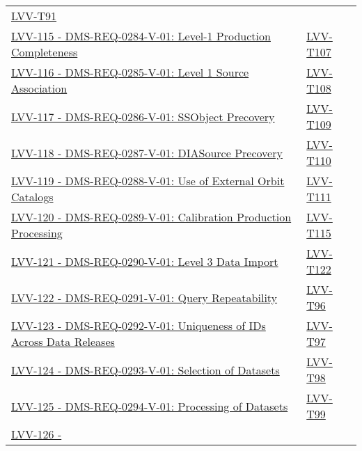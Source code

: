 \begin{longtable}[]{p{13cm}p{3cm}}
\protect\hyperlink{lvv-t91---verify-implementation-of-fringe-correction-frame-dms-req-0283}{LVV-T91}\tabularnewline
\href{https://jira.lsstcorp.org/browse/LVV-115}{LVV-115 -
DMS-REQ-0284-V-01: Level-1 Production Completeness} &
\protect\hyperlink{lvv-t107---verify-implementation-of-level-1-production-completeness-dms-req-0284}{LVV-T107}\tabularnewline
\href{https://jira.lsstcorp.org/browse/LVV-116}{LVV-116 -
DMS-REQ-0285-V-01: Level 1 Source Association} &
\protect\hyperlink{lvv-t108---verify-implementation-of-level-1-source-association-dms-req-0285}{LVV-T108}\tabularnewline
\href{https://jira.lsstcorp.org/browse/LVV-117}{LVV-117 -
DMS-REQ-0286-V-01: SSObject Precovery} &
\protect\hyperlink{lvv-t109---verify-implementation-of-ssobject-precovery-dms-req-0286}{LVV-T109}\tabularnewline
\href{https://jira.lsstcorp.org/browse/LVV-118}{LVV-118 -
DMS-REQ-0287-V-01: DIASource Precovery} &
\protect\hyperlink{lvv-t110---verify-implementation-of-diasource-precovery-dms-req-0287}{LVV-T110}\tabularnewline
\href{https://jira.lsstcorp.org/browse/LVV-119}{LVV-119 -
DMS-REQ-0288-V-01: Use of External Orbit Catalogs} &
\protect\hyperlink{lvv-t111---verify-implementation-of-use-of-external-orbit-catalogs-dms-req-0288}{LVV-T111}\tabularnewline
\href{https://jira.lsstcorp.org/browse/LVV-120}{LVV-120 -
DMS-REQ-0289-V-01: Calibration Production Processing} &
\protect\hyperlink{lvv-t115---verify-implementation-of-calibration-production-processing-dms-req-0289}{LVV-T115}\tabularnewline
\href{https://jira.lsstcorp.org/browse/LVV-121}{LVV-121 -
DMS-REQ-0290-V-01: Level 3 Data Import} &
\protect\hyperlink{lvv-t122---verify-implementation-of-level-3-data-import-dms-req-0290}{LVV-T122}\tabularnewline
\href{https://jira.lsstcorp.org/browse/LVV-122}{LVV-122 -
DMS-REQ-0291-V-01: Query Repeatability} &
\protect\hyperlink{lvv-t96---verify-implementation-of-query-repeatability-dms-req-0291}{LVV-T96}\tabularnewline
\href{https://jira.lsstcorp.org/browse/LVV-123}{LVV-123 -
DMS-REQ-0292-V-01: Uniqueness of IDs Across Data Releases} &
\protect\hyperlink{lvv-t97---verify-implementation-of-uniqueness-of-ids-across-data-releases--dms-req-0292}{LVV-T97}\tabularnewline
\href{https://jira.lsstcorp.org/browse/LVV-124}{LVV-124 -
DMS-REQ-0293-V-01: Selection of Datasets} &
\protect\hyperlink{lvv-t98---verify-implementation-of-selection-of-datasets-dms-req-0293}{LVV-T98}\tabularnewline
\href{https://jira.lsstcorp.org/browse/LVV-125}{LVV-125 -
DMS-REQ-0294-V-01: Processing of Datasets} &
\protect\hyperlink{lvv-t99---verify-implementation-of-processing-of-datasets-dms-req-0294}{LVV-T99}\tabularnewline
\href{https://jira.lsstcorp.org/browse/LVV-126}{LVV-126 -
}
\end{longtable}
